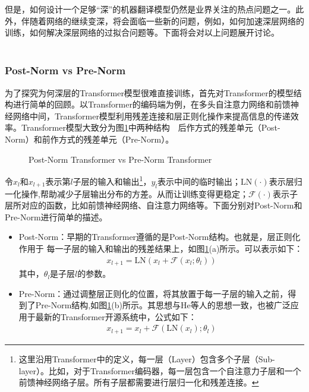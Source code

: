 \parinterval 但是，如何设计一个足够``深''的机器翻译模型仍然是业界关注的热点问题之一。此外，伴随着网络的继续变深，将会面临一些新的问题，例如，如何加速深层网络的训练，如何解决深层网络的过拟合问题等。下面将会对以上问题展开讨论。\\ \\


\subsubsection{Post-Norm vs Pre-Norm}

\parinterval 为了探究为何深层的Transformer模型很难直接训练，首先对Transformer的模型结构进行简单的回顾。以Transformer的编码端为例，在多头自注意力网络和前馈神经网络中间，Transformer模型利用残差连接和层正则化操作来提高信息的传递效率。Transformer模型大致分为图\ref{fig:7-28}中两种结构\ \dash \ 后作方式的残差单元（Post-Norm）和前作方式的残差单元（Pre-Norm）。

\begin{figure}[htp]
\centering

\caption{Post-Norm Transformer vs Pre-Norm Transformer}
\label{fig:7-28}
\end{figure}

\parinterval 令$x_l$和$x_{l+1}$表示第$l$子层的输入和输出\footnote[13]{这里沿用Transformer中的定义，每一层（Layer）包含多个子层（Sub-layer）。比如，对于Transformer编码器，每一层包含一个自注意力子层和一个前馈神经网络子层。所有子层都需要进行层归一化和残差连接。}，$y_l$表示中间的临时输出；$\textrm{LN}(\cdot)$表示层归一化操作\cite{Ba2016LayerN},帮助减少子层输出分布的方差。从而让训练变得更稳定；$\mathcal{F}(\cdot)$表示子层所对应的函数，比如前馈神经网络、自注意力网络等。下面分别对Post-Norm和Pre-Norm进行简单的描述。
\begin{itemize}
\vspace{0.5em}
\item Post-Norm：早期的Transformer遵循的是Post-Norm结构\cite{NIPS2017_7181}。也就是，层正则化作用于 每一子层的输入和输出的残差结果上，如图\ref{fig:7-28}(a)所示。可以表示如下：
\begin{eqnarray}
x_{l+1}=\textrm{LN}(x_l+\mathcal{F}(x_l;\theta_l))
\label{eq:7-16}
\end{eqnarray}
其中，$\theta_l$是子层$l$的参数。
\vspace{0.5em}
\item Pre-Norm：通过调整层正则化的位置，将其放置于每一子层的输入之前，得到了Pre-Norm结构,如图\ref{fig:7-28}(b)所示。其思想与He等人的思想一致\cite{DBLP:conf/eccv/HeZRS16}，也被广泛应用于最新的Transformer开源系统中\cite{VaswaniTensor2Tensor,Ottfairseq,KleinOpenNMT}，公式如下：
\begin{eqnarray}
x_{l+1}=x_l+\mathcal{F}(\textrm{LN}(x_l);\theta_l)
\label{eq:7-17}
\end{eqnarray}
\end{itemize}

